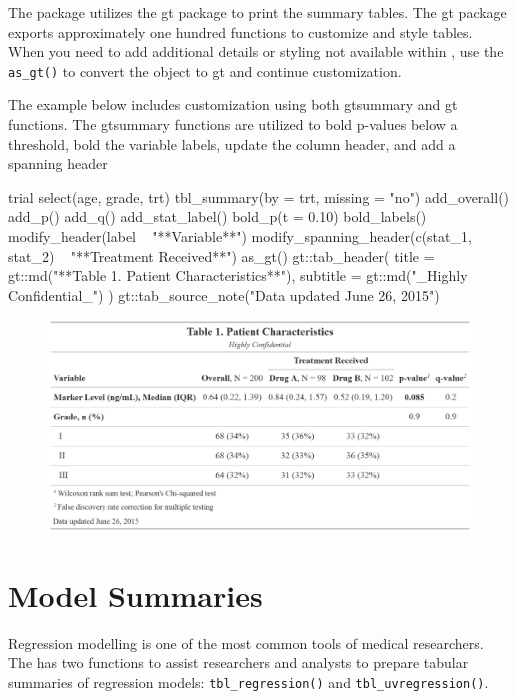 The  package utilizes the gt package \citep{gt} to print the summary tables.
The gt package exports approximately one hundred functions to customize and style tables.
When you need to add additional details or styling not available within , use the \texttt{as\_gt()} to convert the  object to gt and continue customization.

The example below includes customization using both gtsummary and gt functions.
The gtsummary functions are utilized to bold p-values below a threshold, bold the variable labels,  update the column header, and add a spanning header

\begin{example}
trial %
  select(age, grade, trt) %
tbl_summary(by = trt, missing = "no") %
  add_overall() %
  add_p() %
  add_q() %
  add_stat_label() %
  bold_p(t = 0.10) %
  bold_labels() %
  modify_header(label ~ "**Variable**") %
  modify_spanning_header(c(stat_1, stat_2) ~ "**Treatment Received**") %
  as_gt() %
  gt::tab_header(
    title = gt::md("**Table 1. Patient Characteristics**"),
    subtitle = gt::md("_Highly Confidential_")
  ) %
  gt::tab_source_note("Data updated June 26, 2015")
\end{example}
\begin{figure}[h!]
  \includegraphics[scale=0.28]{custom.png}
  \centering
\end{figure}

\section{Model Summaries}

Regression modelling is one of the most common tools of medical researchers.
The  has two functions to assist researchers and analysts to prepare tabular summaries of regression models: \texttt{tbl\_regression()} and \texttt{tbl\_uvregression()}.

